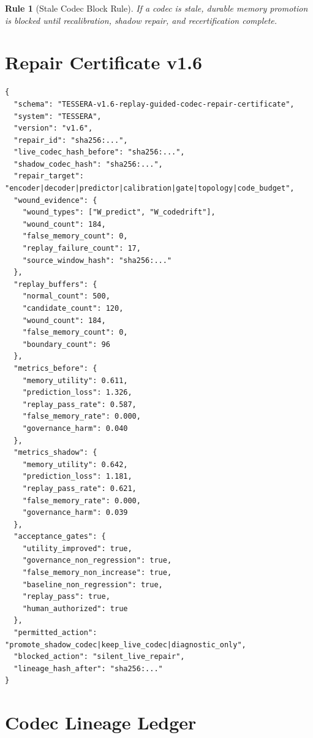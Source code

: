 \documentclass[12pt]{article}
\newtheorem{rulebox}{Rule}
\begin{document}
\begin{rulebox}[Stale Codec Block Rule]
If a codec is stale, durable memory promotion is blocked until recalibration,
shadow repair, and recertification complete.
\end{rulebox}

\section{Repair Certificate v1.6}

\begin{lstlisting}
{
  "schema": "TESSERA-v1.6-replay-guided-codec-repair-certificate",
  "system": "TESSERA",
  "version": "v1.6",
  "repair_id": "sha256:...",
  "live_codec_hash_before": "sha256:...",
  "shadow_codec_hash": "sha256:...",
  "repair_target": "encoder|decoder|predictor|calibration|gate|topology|code_budget",
  "wound_evidence": {
    "wound_types": ["W_predict", "W_codedrift"],
    "wound_count": 184,
    "false_memory_count": 0,
    "replay_failure_count": 17,
    "source_window_hash": "sha256:..."
  },
  "replay_buffers": {
    "normal_count": 500,
    "candidate_count": 120,
    "wound_count": 184,
    "false_memory_count": 0,
    "boundary_count": 96
  },
  "metrics_before": {
    "memory_utility": 0.611,
    "prediction_loss": 1.326,
    "replay_pass_rate": 0.587,
    "false_memory_rate": 0.000,
    "governance_harm": 0.040
  },
  "metrics_shadow": {
    "memory_utility": 0.642,
    "prediction_loss": 1.181,
    "replay_pass_rate": 0.621,
    "false_memory_rate": 0.000,
    "governance_harm": 0.039
  },
  "acceptance_gates": {
    "utility_improved": true,
    "governance_non_regression": true,
    "false_memory_non_increase": true,
    "baseline_non_regression": true,
    "replay_pass": true,
    "human_authorized": true
  },
  "permitted_action": "promote_shadow_codec|keep_live_codec|diagnostic_only",
  "blocked_action": "silent_live_repair",
  "lineage_hash_after": "sha256:..."
}
\end{lstlisting}

\section{Codec Lineage Ledger}
\end{document}
